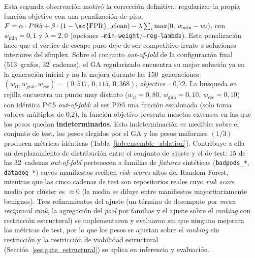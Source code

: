Esta segunda observación motivó la corrección definitiva: regularizar la propia
función objetivo con una penalización de piso,
\(F = \alpha \cdot P@5 + \beta \cdot (1-\text{\ac{FPR}\_clean}) -
\lambda \sum_i \max(0,\, w_{\min} - w_i)\), con \(w_{\min}=0{,}1\) y
\(\lambda=2{,}0\) (opciones \texttt{--min-weight}/\texttt{--reg-lambda}). Esta
penalización hace que el vértice de escape puro deje de ser competitivo frente a
soluciones interiores del símplex. Sobre el conjunto \textit{out-of-fold} de la
configuración final (513~grafos, 32~cadenas), el \ac{GA} regularizado encuentra
su mejor solución ya en la generación inicial y no la mejora durante las
150~generaciones:
\((w_{\text{rf}}, w_{\text{gnn}}, w_{\text{esc}}) = (0{,}517,\, 0{,}115,\, 0{,}368)\),
\textit{objective}\,=\,0,72. La búsqueda en rejilla encuentra un punto muy
distinto (\(w_{\text{rf}}=0{,}80,\, w_{\text{gnn}}=0{,}10,\,
w_{\text{esc}}=0{,}10\)) con idéntica P@5 \textit{out-of-fold}: al ser P@5 una
función escalonada (solo toma valores múltiplos de 0,2), la función objetivo
presenta mesetas extensas en las que los pesos quedan \textbf{indeterminados}.
Esta indeterminación es medible: sobre el conjunto de test, los pesos elegidos
por el \ac{GA} y los pesos uniformes \((1/3)\) producen métricas idénticas
(Tabla~\ref{tab:ensemble_ablation}). Contribuye a ella un desplazamiento de
distribución entre el conjunto de ajuste y el de test: 15 de las 32~cadenas
\textit{out-of-fold} pertenecen a familias de \textit{fixtures} sintéticas
(\texttt{badpods\_*}, \texttt{datadog\_*}) cuyos manifiestos reciben
\textit{risk scores} altos del Random Forest, mientras que las cinco cadenas de test son
repositorios reales cuyo \textit{risk score} medio por clúster es
\(\approx\)0 (la media se diluye entre manifiestos mayoritariamente benignos).
Tres refinamientos del ajuste (un término de desempate por \textit{mean
reciprocal rank}, la agregación del \textit{pool} por familias y el ajuste sobre
el \textit{ranking} con restricción estructural) se implementaron y evaluaron
sin que ninguno mejorara las métricas de test, por lo que los pesos se ajustan
sobre el \textit{ranking} sin restricción y la restricción de viabilidad
estructural (Sección~\ref{sec:gate_estructural}) se aplica en inferencia y
evaluación.

